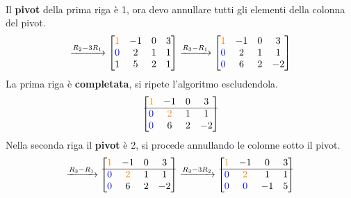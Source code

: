 \documentclass[a4paper, 12pt]{report}
\begin{document}
                \paragraph{}Il \textbf{pivot} della prima riga è 1, ora devo annullare tutti gli elementi della colonna del pivot.
                $$
                    \xrightarrow[]{R_2-3R_1}                    
                    \begin{bmatrix}
                        \textcolor{orange}{1} & -1 & 0 & 3\\
                        \textcolor{blue}{0} & 2 & 1 & 1\\
                        1 & 5 & 2 & 1
                    \end{bmatrix}
                    \xrightarrow[]{R_3-R_1}                    
                    \begin{bmatrix}
                        \textcolor{orange}{1} & -1 & 0 & 3\\
                        \textcolor{blue}{0} & 2 & 1 & 1\\
                        \textcolor{blue}{0} & 6 & 2 & -2
                    \end{bmatrix}
                $$
                La prima riga è \textbf{completata}, si ripete l'algoritmo escludendola.
                $$
                    \begin{bmatrix}
                        \textcolor{orange}{1} & -1 & 0 & 3\\
                        \hline
                        \textcolor{blue}{0} & \textcolor{orange}{2} & 1 & 1\\
                        \textcolor{blue}{0} & 6 & 2 & -2
                    \end{bmatrix}
                $$
                Nella seconda riga il \textbf{pivot} è 2, si procede annullando le colonne sotto il pivot.
                $$
                    \xrightarrow[]{R_3-R_1}
                    \begin{bmatrix}
                        \textcolor{orange}{1} & -1 & 0 & 3\\
                        \hline
                        \textcolor{blue}{0} & \textcolor{orange}{2} & 1 & 1\\
                        \textcolor{blue}{0} & 6 & 2 & -2
                    \end{bmatrix}
                    \xrightarrow[]{R_3-3R_2}
                    \begin{bmatrix}
                        \textcolor{orange}{1} & -1 & 0 & 3\\
                        \hline
                        \textcolor{blue}{0} & \textcolor{orange}{2} & 1 & 1\\
                        \textcolor{blue}{0} & \textcolor{blue}{0} & -1 & 5
                    \end{bmatrix}
                $$
\end{document}
